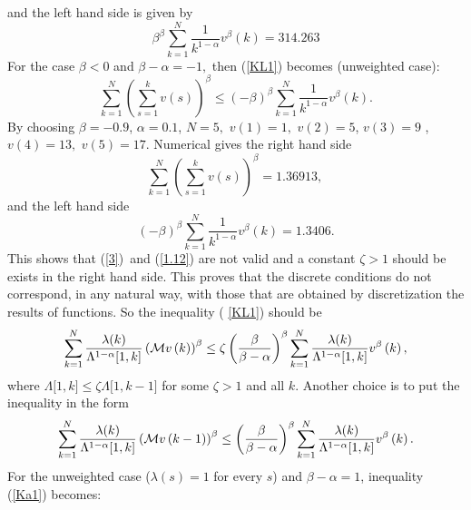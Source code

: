 \documentclass[a4paper]{amsart}
\theoremstyle{plain}
\numberwithin{equation}{section}
\begin{document}
and the left hand side is given by%
\begin{equation*}
\beta ^{\beta }\sum\limits_{k=1}^{N}\frac{1}{k^{1-\alpha }}v^{\beta }\left(
k\right) =314.263
\end{equation*}%
For the case $\beta <0$ and $\beta -\alpha =-1,$ then (\ref{KL1}) becomes
(unweighted case): 
\begin{equation}
\sum\limits_{k=1}^{N}\left( \sum\limits_{s=1}^{k}v\left( s\right) \right)
^{\beta }\leq (-\beta )^{\beta }\sum\limits_{k=1}^{N}\frac{1}{k^{1-\alpha }}%
v^{\beta }\left( k\right) .  \label{1.12}
\end{equation}%
By choosing $\beta =-0.9$, $\alpha =0.1$, $N=5,$ $v(1)=1,$ $v(2)=5$, $v(3)=9$%
, $v(4)=13,$ $v(5)=17.$ Numerical gives the right hand side 
\begin{equation*}
\sum\limits_{k=1}^{N}\left( \sum\limits_{s=1}^{k}v\left( s\right) \right)
^{\beta }=1.36913\text{, }
\end{equation*}%
and the left hand side%
\begin{equation*}
(-\beta )^{\beta }\sum\limits_{k=1}^{N}\frac{1}{k^{1-\alpha }}v^{\beta
}\left( k\right) =1.3406.
\end{equation*}%
This shows that (\ref{3})\ and (\ref{1.12}) are not valid and a constant $%
\zeta >1$ should be exists in the right hand side. This proves that the
discrete conditions do not correspond, in any natural way, with those that
are obtained by discretization the results of functions. So the inequality (%
\ref{KL1}) should be 
\begin{equation*}
\sum\limits_{k=1}^{N}\frac{\lambda (k)}{\Lambda ^{1-\alpha }[1,k]}\left( 
\mathcal{M}v\left( k\right) \right) ^{\beta }\leq \zeta \left( \frac{\beta }{%
\beta -\alpha }\right) ^{\beta }\sum\limits_{k=1}^{N}\frac{\lambda (k)}{%
\Lambda ^{1-\alpha }[1,k]}v^{\beta }\left( k\right) ,
\end{equation*}%
where $\Lambda \lbrack 1,k]\leq \zeta \Lambda \lbrack 1,k-1]$ for some $%
\zeta >1$ and all $k$. Another choice is to put the inequality in the form 
\begin{equation}
\sum\limits_{k=1}^{N}\frac{\lambda (k)}{\Lambda ^{1-\alpha }[1,k]}\left( 
\mathcal{M}v\left( k-1\right) \right) ^{\beta }\leq \left( \frac{\beta }{%
\beta -\alpha }\right) ^{\beta }\sum\limits_{k=1}^{N}\frac{\lambda (k)}{%
\Lambda ^{1-\alpha }[1,k]}v^{\beta }\left( k\right) .  \label{Ka1}
\end{equation}%
For the unweighted case ($\lambda (s)=1$ for every $s$) and $\beta -\alpha
=1 $, inequality (\ref{Ka1}) becomes:%
\end{document}
